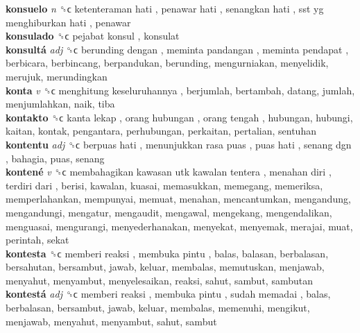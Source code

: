 \textbf{konsuelo} \emph{n}  ␝ϲ   ketenteraman hati ,  penawar hati ,  senangkan hati ,  sst yg menghiburkan hati , penawar  \\
\textbf{konsulado} ␝ϲ   pejabat konsul , konsulat  \\
\textbf{konsultá} \emph{adj}  ␝ϲ   berunding dengan ,  meminta pandangan ,  meminta pendapat , berbicara, berbincang, berpandukan, berunding, mengurniakan, menyelidik, merujuk, merundingkan  \\
\textbf{konta} \emph{v}  ␝ϲ   menghitung keseluruhannya , berjumlah, bertambah, datang, jumlah, menjumlahkan, naik, tiba  \\
\textbf{kontakto} ␝ϲ   kanta lekap ,  orang hubungan ,  orang tengah , hubungan, hubungi, kaitan, kontak, pengantara, perhubungan, perkaitan, pertalian, sentuhan  \\
\textbf{kontentu} \emph{adj}  ␝ϲ   berpuas hati ,  menunjukkan rasa puas ,  puas hati ,  senang dgn , bahagia, puas, senang  \\
\textbf{kontené} \emph{v}  ␝ϲ   membahagikan kawasan utk kawalan tentera ,  menahan diri ,  terdiri dari , berisi, kawalan, kuasai, memasukkan, memegang, memeriksa, memperlahankan, mempunyai, memuat, menahan, mencantumkan, mengandung, mengandungi, mengatur, mengaudit, mengawal, mengekang, mengendalikan, menguasai, mengurangi, menyederhanakan, menyekat, menyemak, merajai, muat, perintah, sekat  \\
\textbf{kontesta} ␝ϲ   memberi reaksi ,  membuka pintu , balas, balasan, berbalasan, bersahutan, bersambut, jawab, keluar, membalas, memutuskan, menjawab, menyahut, menyambut, menyelesaikan, reaksi, sahut, sambut, sambutan  \\
\textbf{kontestá} \emph{adj}  ␝ϲ   memberi reaksi ,  membuka pintu ,  sudah memadai , balas, berbalasan, bersambut, jawab, keluar, membalas, memenuhi, mengikut, menjawab, menyahut, menyambut, sahut, sambut  \\
